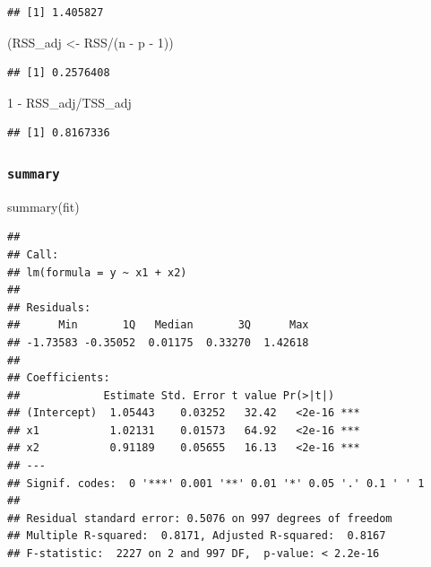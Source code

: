 \documentclass[
  12pt,
]{book}
\newenvironment{Shaded}{\begin{snugshade}}{\end{snugshade}}
\newcommand{\DecValTok}[1]{\textcolor[rgb]{0.00,0.00,0.81}{#1}}
\newcommand{\FunctionTok}[1]{\textcolor[rgb]{0.00,0.00,0.00}{#1}}
\newcommand{\NormalTok}[1]{#1}
\newcommand{\OtherTok}[1]{\textcolor[rgb]{0.56,0.35,0.01}{#1}}
\newcommand{\SpecialCharTok}[1]{\textcolor[rgb]{0.00,0.00,0.00}{#1}}
\begin{document}
\begin{verbatim}
## [1] 1.405827
\end{verbatim}

\begin{Shaded}
\begin{Highlighting}[]
\NormalTok{(RSS\_adj }\OtherTok{\textless{}{-}}\NormalTok{ RSS}\SpecialCharTok{/}\NormalTok{(n }\SpecialCharTok{{-}}\NormalTok{ p }\SpecialCharTok{{-}} \DecValTok{1}\NormalTok{))}
\end{Highlighting}
\end{Shaded}

\begin{verbatim}
## [1] 0.2576408
\end{verbatim}

\begin{Shaded}
\begin{Highlighting}[]
\DecValTok{1} \SpecialCharTok{{-}}\NormalTok{ RSS\_adj}\SpecialCharTok{/}\NormalTok{TSS\_adj}
\end{Highlighting}
\end{Shaded}

\begin{verbatim}
## [1] 0.8167336
\end{verbatim}

\hypertarget{summary}{%
\subsubsection{\texorpdfstring{\texttt{summary}}{summary}}\label{summary}}

\begin{Shaded}
\begin{Highlighting}[]
\FunctionTok{summary}\NormalTok{(fit)}
\end{Highlighting}
\end{Shaded}

\begin{verbatim}
## 
## Call:
## lm(formula = y ~ x1 + x2)
## 
## Residuals:
##      Min       1Q   Median       3Q      Max 
## -1.73583 -0.35052  0.01175  0.33270  1.42618 
## 
## Coefficients:
##             Estimate Std. Error t value Pr(>|t|)    
## (Intercept)  1.05443    0.03252   32.42   <2e-16 ***
## x1           1.02131    0.01573   64.92   <2e-16 ***
## x2           0.91189    0.05655   16.13   <2e-16 ***
## ---
## Signif. codes:  0 '***' 0.001 '**' 0.01 '*' 0.05 '.' 0.1 ' ' 1
## 
## Residual standard error: 0.5076 on 997 degrees of freedom
## Multiple R-squared:  0.8171, Adjusted R-squared:  0.8167 
## F-statistic:  2227 on 2 and 997 DF,  p-value: < 2.2e-16
\end{verbatim}
\end{document}
